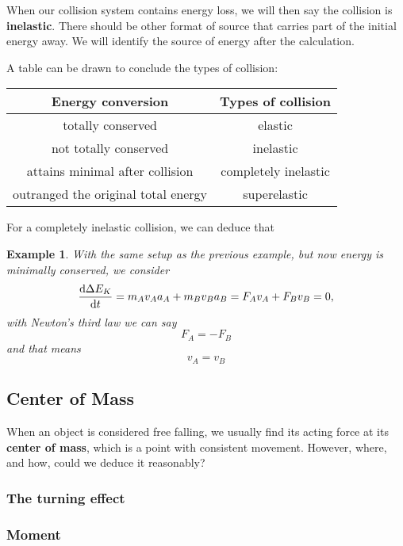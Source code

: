 \documentclass[12pt]{article}
\newtheorem*{example}{Example}
\begin{document}
    When our collision system contains energy loss, we will then say the collision is \textbf{inelastic}. There should be other format of source that carries part of the initial energy away. We will identify the source of energy after the calculation.

    A table can be drawn to conclude the types of collision:

    \begin{center}
        \begin{tabular}{|c|c|}
            \hline
            Energy conversion&Types of collision\\
            \hline
            totally conserved&elastic\\
            \hline
            not totally conserved&inelastic\\
            \hline
            attains minimal after collision&completely inelastic\\
            \hline
            outranged the original total energy&superelastic\\
            \hline
        \end{tabular}
    \end{center}

    For a completely inelastic collision, we can deduce that

    \begin{example}
        With the same setup as the previous example, but now energy is minimally conserved, we consider \[\derivative{\Delta E_K}{t}=m_A v_A a_A+m_B v_B a_B = F_A v_A + F_B v_B = 0,\] with Newton's third law we can say \[F_A = -F_B\] and that means \[v_A = v_B\]
    \end{example}

    \subsection{Center of Mass}

    When an object is considered free falling, we usually find its acting force at its \textbf{center of mass}, which is a point with consistent movement. However, where, and how, could we deduce it reasonably?

    \subsubsection*{The turning effect}

    \subsubsection*{Moment}
\end{document}
